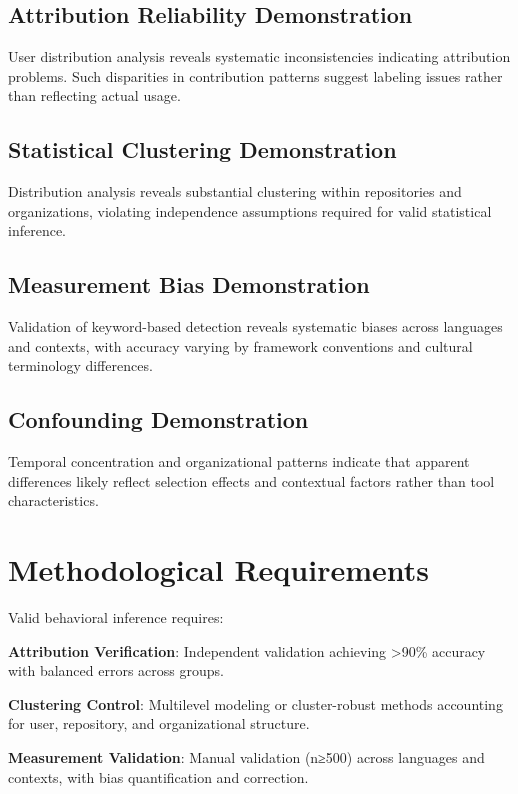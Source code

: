 \documentclass[conference]{IEEEtran}
\begin{document}
\subsection{Attribution Reliability Demonstration}

User distribution analysis reveals systematic inconsistencies indicating attribution problems. Such disparities in contribution patterns suggest labeling issues rather than reflecting actual usage.

\subsection{Statistical Clustering Demonstration}

Distribution analysis reveals substantial clustering within repositories and organizations, violating independence assumptions required for valid statistical inference.

\subsection{Measurement Bias Demonstration}

Validation of keyword-based detection reveals systematic biases across languages and contexts, with accuracy varying by framework conventions and cultural terminology differences.

\subsection{Confounding Demonstration}

Temporal concentration and organizational patterns indicate that apparent differences likely reflect selection effects and contextual factors rather than tool characteristics.

\section{Methodological Requirements}

Valid behavioral inference requires:

\textbf{Attribution Verification}: Independent validation achieving >90\% accuracy with balanced errors across groups.

\textbf{Clustering Control}: Multilevel modeling or cluster-robust methods accounting for user, repository, and organizational structure.

\textbf{Measurement Validation}: Manual validation (n≥500) across languages and contexts, with bias quantification and correction.
\end{document}
